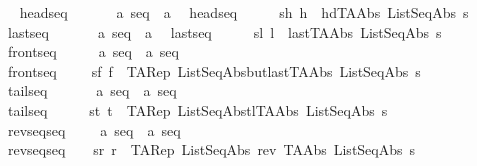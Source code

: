 \begin{isabellebody}
\ \isanewline
\isanewline
\ \ headseq\ \ \ \ \ \ {\isacharcolon}{\isacharcolon}\ {\isachardoublequoteopen}{\isacharprime}a\ seq\ {\isacharless}{\isacharequal}{\isachargreater}\ {\isacharprime}a{\isachardoublequoteclose}\isanewline
\ \ {\isachardoublequoteopen}headseq\ \ \ \ \ {\isacharequal}{\isacharequal}\ {\isacharbraceleft}{\isacharparenleft}s{\isacharcomma}h{\isacharparenright}{\isachardot}\ h\ {\isacharequal}\ {\isacharparenleft}hd{\isacharparenleft}TAAbs\ ListSeqAbs\ s{\isacharparenright}{\isacharparenright}{\isacharbraceright}{\isachardoublequoteclose}\ \isanewline
\isanewline
\ \ lastseq\ \ \ \ \ \ {\isacharcolon}{\isacharcolon}\ {\isachardoublequoteopen}{\isacharprime}a\ seq\ {\isacharless}{\isacharequal}{\isachargreater}\ {\isacharprime}a{\isachardoublequoteclose}\isanewline
\ \ {\isachardoublequoteopen}lastseq\ \ \ \ \ {\isacharequal}{\isacharequal}\ {\isacharbraceleft}{\isacharparenleft}s{\isacharcomma}l{\isacharparenright}{\isachardot}\ l\ {\isacharequal}\ {\isacharparenleft}last{\isacharparenleft}TAAbs\ ListSeqAbs\ s{\isacharparenright}{\isacharparenright}{\isacharbraceright}{\isachardoublequoteclose}\isanewline
\isanewline
\ \ frontseq\ \ \ \ \ {\isacharcolon}{\isacharcolon}\ {\isachardoublequoteopen}{\isacharprime}a\ seq\ {\isacharless}{\isacharequal}{\isachargreater}\ {\isacharprime}a\ seq{\isachardoublequoteclose}\isanewline
\ \ {\isachardoublequoteopen}frontseq\ \ \ \ {\isacharequal}{\isacharequal}\ {\isacharbraceleft}{\isacharparenleft}s{\isacharcomma}f{\isacharparenright}{\isachardot}\ f\ {\isacharequal}\ TARep\ ListSeqAbs{\isacharparenleft}butlast{\isacharparenleft}TAAbs\ ListSeqAbs\ s{\isacharparenright}{\isacharparenright}{\isacharbraceright}{\isachardoublequoteclose}\isanewline
\isanewline
\ \ tailseq\ \ \ \ \ \ {\isacharcolon}{\isacharcolon}\ {\isachardoublequoteopen}{\isacharprime}a\ seq\ {\isacharless}{\isacharequal}{\isachargreater}\ {\isacharprime}a\ seq{\isachardoublequoteclose}\isanewline
\ \ {\isachardoublequoteopen}tailseq\ \ \ \ \ {\isacharequal}{\isacharequal}\ {\isacharbraceleft}{\isacharparenleft}s{\isacharcomma}t{\isacharparenright}{\isachardot}\ t\ {\isacharequal}\ TARep\ ListSeqAbs{\isacharparenleft}tl{\isacharparenleft}TAAbs\ ListSeqAbs\ s{\isacharparenright}{\isacharparenright}{\isacharbraceright}{\isachardoublequoteclose}\isanewline
\isanewline
\ \ revseqseq\ \ \ \ {\isacharcolon}{\isacharcolon}\ {\isachardoublequoteopen}{\isacharprime}a\ seq\ {\isacharless}{\isacharequal}{\isachargreater}\ {\isacharprime}a\ seq{\isachardoublequoteclose}\isanewline
\ \ {\isachardoublequoteopen}revseqseq\ \ \ {\isacharequal}{\isacharequal}\ {\isacharbraceleft}{\isacharparenleft}s{\isacharcomma}r{\isacharparenright}{\isachardot}\ r\ {\isacharequal}\ TARep\ ListSeqAbs\ {\isacharparenleft}rev\ {\isacharparenleft}TAAbs\ ListSeqAbs\ s{\isacharparenright}{\isacharparenright}{\isacharbraceright}{\isachardoublequoteclose}\isanewline

\end{isabellebody}
